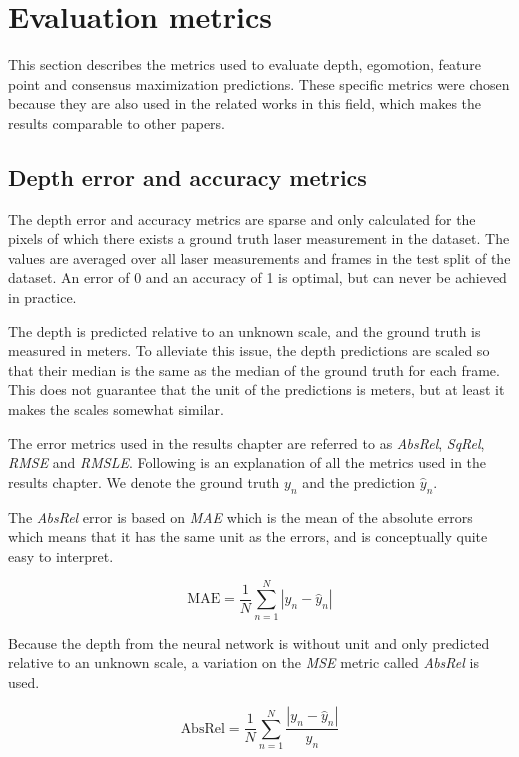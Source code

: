 \section{Evaluation metrics}\label{sec:metrics}

This section describes the metrics used to evaluate depth, egomotion, feature point and consensus maximization predictions. These specific metrics were chosen because they are also used in the related works in this field, which makes the results comparable to other papers.

\subsection{Depth error and accuracy metrics}
\label{sec:depthmetrics}

The depth error and accuracy metrics are sparse and only calculated for the pixels of which there exists a ground truth laser measurement in the dataset. The values are averaged over all laser measurements and frames in the test split of the dataset. An error of 0 and an accuracy of 1 is optimal, but can never be achieved in practice.

The depth is predicted relative to an unknown scale, and the ground truth is measured in meters. To alleviate this issue, the depth predictions are scaled so that their median is the same as the median of the ground truth for each frame. This does not guarantee that the unit of the predictions is meters, but at least it makes the scales somewhat similar.

The error metrics used in the results chapter are referred to as \textit{AbsRel}, \textit{SqRel}, \textit{RMSE} and \textit{RMSLE}. Following is an explanation of all the metrics used in the results chapter. We denote the ground truth $y_n$ and the prediction $\hat{y}_n$.

The \textit{AbsRel} error is based on \textit{MAE} which is the mean of the absolute errors which means that it has the same unit as the errors, and is conceptually quite easy to interpret.

\begin{equation}
\textrm{MAE}=\frac{1}{N}\sum^N_{n=1}{|y_n-\hat{y}_n|}
\end{equation}

Because the depth from the neural network is without unit and only predicted relative to an unknown scale, a variation on the \textit{MSE} metric called \textit{AbsRel} is used.

\begin{equation}
\textrm{AbsRel}=\frac{1}{N}\sum^N_{n=1}{\frac{|y_n-\hat{y}_n|}{y_n}}
\end{equation}

